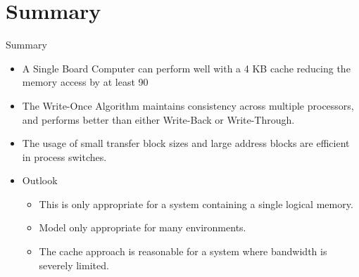 \documentclass{beamer}
\begin{document}

\section*{Summary}

\begin{frame}{Summary}
  \begin{itemize}
  \item
    A Single Board Computer can perform well with a \alert{4 KB} cache reducing the memory access by at least 90%
  \item
    The \alert{Write-Once Algorithm} maintains consistency across multiple processors, and performs better than either Write-Back or Write-Through.
  \item
    The usage of \alert{small transfer block sizes} and \alert{large address blocks} are efficient in process switches.
  \end{itemize}
  
  \begin{itemize}
  \item
    Outlook
    \begin{itemize}
    \item
      This is only appropriate for a system containing a single logical memory.
    \item
      Model only appropriate for many environments.
    \item
	  The cache approach is reasonable for a system where bandwidth is severely limited.
    \end{itemize}
  \end{itemize}
\end{frame}



\end{document}
